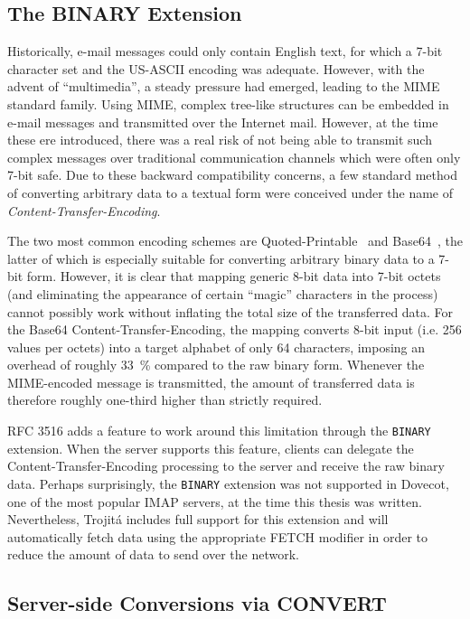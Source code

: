 \documentclass[trojita]{subfiles}
\begin{document}
\subsection{The BINARY Extension}

Historically, e-mail messages could only contain English text, for which a 7-bit character set and the US-ASCII encoding
was adequate.  However, with the advent of ``multimedia'', a steady pressure had emerged, leading to the MIME standard
family.  Using MIME, complex tree-like structures can be embedded in e-mail messages and transmitted over the Internet
mail.  However, at the time these ere introduced, there was a real risk of not being able to transmit such complex
messages over traditional communication channels which were often only 7-bit safe.  Due to these backward compatibility
concerns, a few standard method of converting arbitrary data to a textual form were conceived under the name of {\em
Content-Transfer-Encoding}.

The two most common encoding schemes are Quoted-Printable~\cite[p. 18]{rfc2045} and Base64~\cite[p. 23]{rfc2045}, the
latter of which is especially suitable for converting arbitrary binary data to a 7-bit form.  However, it is clear that
mapping generic 8-bit data into 7-bit octets (and eliminating the appearance of certain ``magic'' characters in the
process) cannot possibly work without inflating the total size of the transferred data.  For the Base64
Content-Transfer-Encoding, the mapping converts 8-bit input (i.e. 256 values per octets) into a target alphabet of only
64 characters, imposing an overhead of roughly 33~\% compared to the raw binary form.  Whenever the MIME-encoded message
is transmitted, the amount of transferred data is therefore roughly one-third higher than strictly required.

RFC 3516 \cite{rfc3516} adds a feature to work around this limitation through the {\tt BINARY} extension.  When the
server supports this feature, clients can delegate the Content-Transfer-Encoding processing to the server and receive
the raw binary data.  Perhaps surprisingly, the {\tt BINARY} extension was not supported in Dovecot, one of the most
popular IMAP servers, at the time this thesis was written.  Nevertheless, Trojitá includes full support for this
extension and will automatically fetch data using the appropriate FETCH modifier in order to reduce the amount of data
to send over the network.

\subsection{Server-side Conversions via CONVERT}
\end{document}
